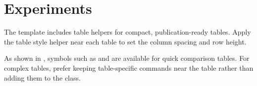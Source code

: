 \section{Experiments}

The template includes table helpers for compact, publication-ready tables.
Apply the table style helper near each table to set the column spacing and
row height.



As shown in , symbols such as \texttt{\string\cmark} and
\texttt{\string\xmark} are available for quick comparison tables. For complex
tables, prefer keeping table-specific commands near the table rather than adding
them to the class.
